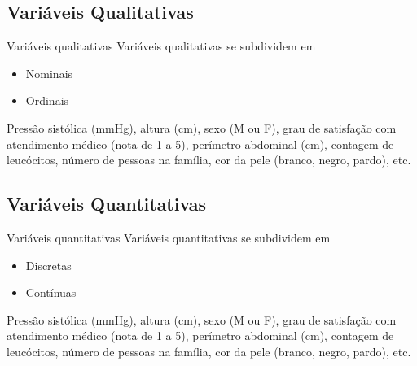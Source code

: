 \documentclass{beamer}
\begin{document}
\subsection{Variáveis Qualitativas}

\begin{frame}{Variáveis qualitativas}
Variáveis qualitativas se subdividem em
  \begin{itemize}
  \item<1-2> Nominais

  \item<3-4> Ordinais
  \end{itemize}


  \begin{example}
    Pressão sistólica (mmHg), altura (cm), \alert{sexo (M ou
      F)}, \alert{grau de satisfação com atendimento médico
      (nota de 1 a 5)}, perímetro abdominal (cm), contagem de
    leucócitos, número de pessoas na família, \alert{cor da
      pele (branco, negro, pardo)}, etc.
  \end{example}

\end{frame}

\subsection{Variáveis Quantitativas}

\begin{frame}{Variáveis quantitativas}
Variáveis quantitativas se subdividem em
  \begin{itemize}
  \item<1-2> Discretas
  \item<3-4> Contínuas
  \end{itemize}
  \begin{example}
    \alert{Pressão sistólica (mmHg)}, \alert{altura
      (cm)}, sexo (M ou F), grau de satisfação com atendimento médico
    (nota de 1 a 5), perímetro abdominal (cm), \alert{contagem
      de leucócitos}, \alert{número de pessoas na família},
    cor da pele (branco, negro, pardo), etc.
  \end{example}
\end{frame}
\end{document}
